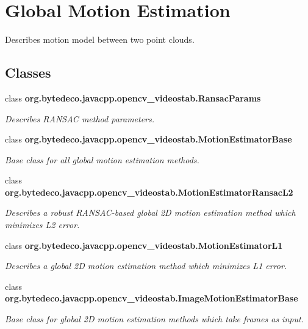 \hypertarget{group__videostab__motion}{}\section{Global Motion Estimation}
\label{group__videostab__motion}


Describes motion model between two point clouds.  


\subsection*{Classes}
\begin{DoxyCompactItemize}
\item 
class {\bfseries org.\+bytedeco.\+javacpp.\+opencv\+\_\+videostab.\+Ransac\+Params}
\begin{DoxyCompactList}\small\item\em Describes R\+A\+N\+S\+AC method parameters. \end{DoxyCompactList}\item 
class {\bfseries org.\+bytedeco.\+javacpp.\+opencv\+\_\+videostab.\+Motion\+Estimator\+Base}
\begin{DoxyCompactList}\small\item\em Base class for all global motion estimation methods. \end{DoxyCompactList}\item 
class {\bfseries org.\+bytedeco.\+javacpp.\+opencv\+\_\+videostab.\+Motion\+Estimator\+Ransac\+L2}
\begin{DoxyCompactList}\small\item\em Describes a robust R\+A\+N\+S\+A\+C-\/based global 2D motion estimation method which minimizes L2 error. \end{DoxyCompactList}\item 
class {\bfseries org.\+bytedeco.\+javacpp.\+opencv\+\_\+videostab.\+Motion\+Estimator\+L1}
\begin{DoxyCompactList}\small\item\em Describes a global 2D motion estimation method which minimizes L1 error. \end{DoxyCompactList}\item 
class {\bfseries org.\+bytedeco.\+javacpp.\+opencv\+\_\+videostab.\+Image\+Motion\+Estimator\+Base}
\begin{DoxyCompactList}\small\item\em Base class for global 2D motion estimation methods which take frames as input. \end{DoxyCompactList}\item 

\end{DoxyCompactItemize}
